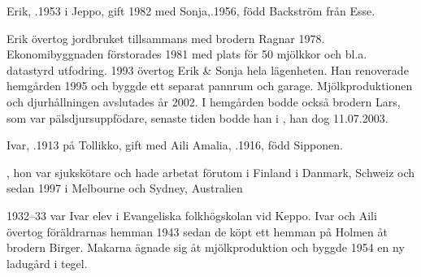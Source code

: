 
%
Erik, .1953 i Jeppo, gift 1982 med Sonja,.1956, född Backström från Esse.
\begin{jhchildren}
  \item {}
  \item {}
  \item {}
  \item {}
  \item {}
  \item {}
  \item {}
\end{jhchildren}

Erik övertog jordbruket tillsammans med brodern Ragnar 1978. 	Ekonomibyggnaden förstorades 1981 med plats för 50 mjölkkor och bl.a. datastyrd utfodring. 1993 övertog Erik \& Sonja hela lägenheten. Han renoverade hemgården 1995 och byggde ett separat pannrum och garage. Mjölkproduktionen och djurhållningen avslutades år 2002. I hemgården bodde också brodern Lars, som var pälsdjursuppfödare, senaste tiden bodde han i , han dog 11.07.2003.


%
Ivar, .1913 på Tollikko, gift med Aili Amalia, .1916, född Sipponen.
\begin{jhchildren}
  \item {}, hon var sjukskötare och hade arbetat förutom i Finland i Danmark, Schweiz och sedan 1997 i Melbourne och Sydney, Australien
  \item {}
  \item {}
  \item {}
  \item {}
\end{jhchildren}
1932--33 var Ivar elev i Evangeliska folkhögskolan vid Keppo. Ivar och Aili övertog föräldrarnas hemman 1943 sedan de köpt ett hemman på Holmen åt brodern Birger. Makarna ägnade sig åt mjölkproduktion och byggde 1954 en ny ladugård i tegel.


